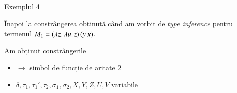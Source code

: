 \documentclass[xcolor=pdftex,romanian,colorlinks]{beamer}
\begin{document}
\begin{frame}{Exemplul 4}

Înapoi la constrângerea obținută când am vorbit de \textit{type inference} pentru termenul {\color{True} $M_1 = (\lambda z.\,\lambda u.\,z)\, (y\, x)$}.

Am obținut constrângerile
\begin{center}
\end{center}
\begin{itemize}
	\item $\to$ simbol de funcție de aritate $2$
	\item $\delta, \tau_1, \tau_1', \tau_2, \sigma_1, \sigma_2, X,Y, Z, U, V$ variabile
\end{itemize}


\end{frame}
\end{document}
